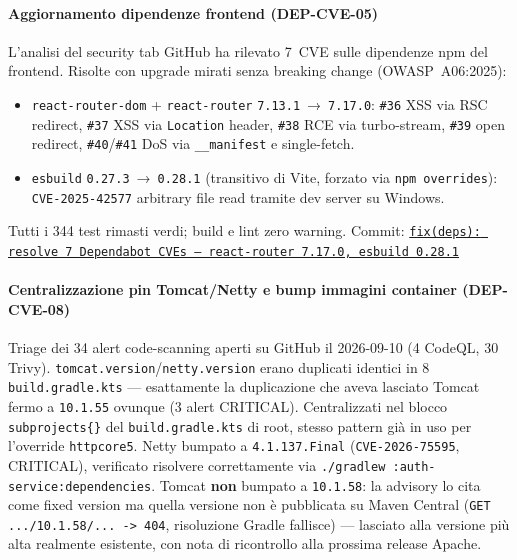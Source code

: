 ﻿\documentclass[a4paper,12pt]{report}
\newcommand{\commitref}[2]{\texttt{\small \href{https://github.com/diegoandruccioli/hotel-pms/commit/#1}{#2}}}
\begin{document}
\paragraph{Aggiornamento dipendenze frontend (DEP-CVE-05)}
L'analisi del security tab GitHub ha rilevato 7~CVE sulle dipendenze npm del frontend.
Risolte con upgrade mirati senza breaking change (OWASP~A06:2025):
\begin{itemize}
  \item \texttt{react-router-dom} + \texttt{react-router} \texttt{7.13.1}~→~\texttt{7.17.0}:
    \texttt{\#36} XSS via RSC redirect, \texttt{\#37} XSS via \texttt{Location} header,
    \texttt{\#38} RCE via turbo-stream, \texttt{\#39} open redirect,
    \texttt{\#40}/\texttt{\#41} DoS via \texttt{\_\_manifest} e single-fetch.
  \item \texttt{esbuild} \texttt{0.27.3}~→~\texttt{0.28.1} (transitivo di Vite,
    forzato via \texttt{npm overrides}): \texttt{CVE-2025-42577} arbitrary file
    read tramite dev server su Windows.
\end{itemize}
Tutti i 344 test rimasti verdi; build e lint zero warning.
Commit: \commitref{b1be3e8}{fix(deps): resolve 7 Dependabot CVEs --- react-router 7.17.0, esbuild 0.28.1}

\paragraph{Centralizzazione pin Tomcat/Netty e bump immagini container (DEP-CVE-08)}
Triage dei 34 alert code-scanning aperti su GitHub il 2026-09-10 (4 CodeQL,
30 Trivy). \texttt{tomcat.version}/\texttt{netty.version} erano duplicati
identici in 8 \texttt{build.gradle.kts} --- esattamente la duplicazione che
aveva lasciato Tomcat fermo a \texttt{10.1.55} ovunque (3 alert CRITICAL).
Centralizzati nel blocco \texttt{subprojects\{\}} del \texttt{build.gradle.kts}
di root, stesso pattern già in uso per l'override \texttt{httpcore5}. Netty
bumpato a \texttt{4.1.137.Final} (\texttt{CVE-2026-75595}, CRITICAL),
verificato risolvere correttamente via
\texttt{./gradlew :auth-service:dependencies}. Tomcat \textbf{non} bumpato a
\texttt{10.1.58}: la advisory lo cita come fixed version ma quella versione
non è pubblicata su Maven Central (\texttt{GET .../10.1.58/... -> 404},
risoluzione Gradle fallisce) --- lasciato alla versione più alta
realmente esistente, con nota di ricontrollo alla prossima release Apache.
\end{document}
